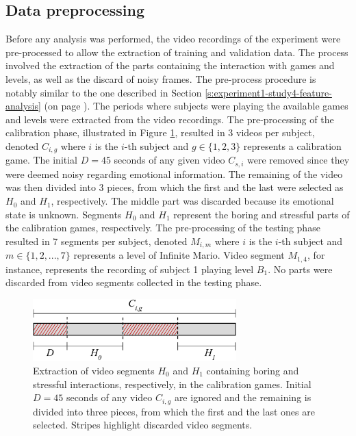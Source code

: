 \subsection{Data preprocessing}

Before any analysis was performed, the video recordings of the experiment were pre-processed to allow the extraction of training and validation data. The process involved the extraction of the parts containing the interaction with games and levels, as well as the discard of noisy frames. The pre-process procedure is notably similar to the one described in Section \ref{s:experiment1-study4-feature-analysis} (on page \pageref{s:experiment1-study4-feature-analysis}). The periods where subjects were playing the available games and levels were extracted from the video recordings. The pre-processing of the calibration phase, illustrated in Figure \ref{fig:experiment2-pre-processing}, resulted in 3 videos per subject, denoted $C_{i,g}$ where $i$ is the $i$-th subject and $g \in \{1, 2, 3\}$ represents a calibration game. The initial $D=45$ seconds of any given video $C_{s,i}$ were removed since they were deemed noisy regarding emotional information. The remaining of the video was then divided into 3 pieces, from which the first and the last were selected as $H_0$ and $H_1$, respectively. The middle part was discarded because its emotional state is unknown. Segments $H_0$ and $H_1$ represent the boring and stressful parts of the calibration games, respectively. The pre-processing of the testing phase resulted in 7 segments per subject, denoted $M_{i,m}$ where $i$ is the $i$-th subject and $m \in \{1, 2, ..., 7\}$ represents a level of Infinite Mario. Video segment $M_{1,4}$, for instance, represents the recording of subject 1 playing level $B_1$. No parts were discarded from video segments collected in the testing phase.

\begin{figure}[h]
    \centering
    \includegraphics[width=0.7\textwidth]{Content/figures/experiment2-pre-processing}
    \caption{Extraction of video segments $H_0$ and $H_1$ containing boring and stressful interactions, respectively, in the calibration games. Initial $D=45$ seconds of any video $C_{i,g}$ are ignored and the remaining is divided into three pieces, from which the first and the last ones are selected. Stripes highlight discarded video segments.}
    \label{fig:experiment2-pre-processing}
\end{figure}

